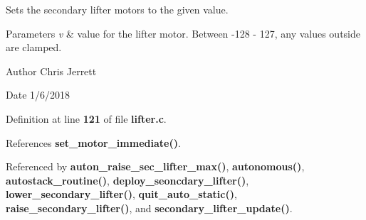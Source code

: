 Sets the secondary lifter motors to the given value. 


\begin{DoxyParams}{Parameters}
{\em v} & value for the lifter motor. Between -\/128 -\/ 127, any values outside are clamped. \\
\hline
\end{DoxyParams}
\begin{DoxyAuthor}{Author}
Chris Jerrett 
\end{DoxyAuthor}
\begin{DoxyDate}{Date}
1/6/2018 
\end{DoxyDate}


Definition at line \textbf{ 121} of file \textbf{ lifter.\+c}.



References \textbf{ set\+\_\+motor\+\_\+immediate()}.



Referenced by \textbf{ auton\+\_\+raise\+\_\+sec\+\_\+lifter\+\_\+max()}, \textbf{ autonomous()}, \textbf{ autostack\+\_\+routine()}, \textbf{ deploy\+\_\+seoncdary\+\_\+lifter()}, \textbf{ lower\+\_\+secondary\+\_\+lifter()}, \textbf{ quit\+\_\+auto\+\_\+static()}, \textbf{ raise\+\_\+secondary\+\_\+lifter()}, and \textbf{ secondary\+\_\+lifter\+\_\+update()}.


